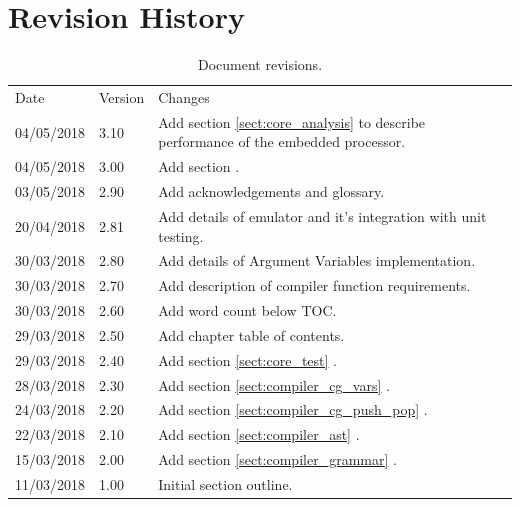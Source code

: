 \documentclass[11pt,a4paper]{report}
\begin{document}
\pagestyle{plain}

\section*{Revision History}
\begin{table}[h]
\def\arraystretch{1.5}
    \begin{tabularx}{\textwidth}{|l|l|X|}
    \hline
    Date & Version & Changes \\
    \arrayrulecolor{blue9}
	\specialrule{2pt}{-2pt}{0pt}
	04/05/2018 & 3.10 & Add section \ref{sect:core_analysis} {\nameref{sect:core_analysis}} to describe performance of the embedded processor. \\ \hline
	04/05/2018 & 3.00 & Add section {\nameref{sect:preface}}. \\ \hline
	03/05/2018 & 2.90 & Add acknowledgements and glossary. \\ \hline
	20/04/2018 & 2.81 & Add details of emulator and it's integration with unit testing.\\ \hline
	30/03/2018 & 2.80 & Add details of Argument Variables implementation. \\ \hline
	30/03/2018 & 2.70 & Add description of compiler function requirements. \\ \hline
	30/03/2018 & 2.60 & Add word count below TOC. \\ \hline
	29/03/2018 & 2.50 & Add chapter table of contents. \\ \hline
	29/03/2018 & 2.40 & Add section \ref{sect:core_test} \nameref{sect:core_test}. \\ \hline
	28/03/2018 & 2.30 & Add section \ref{sect:compiler_cg_vars} \nameref{sect:compiler_cg_vars}. \\ \hline
	24/03/2018 & 2.20 & Add section \ref{sect:compiler_cg_push_pop} \nameref{sect:compiler_cg_push_pop}. \\ \hline
	22/03/2018 & 2.10 & Add section \ref{sect:compiler_ast} \nameref{sect:compiler_ast}. \\ \hline
	15/03/2018 & 2.00 & Add section \ref{sect:compiler_grammar} \nameref{sect:compiler_grammar}. \\ \hline
	11/03/2018 & 1.00 & Initial section outline. \\ \hline
    \end{tabularx}
    \caption{Document revisions.}
\end{table}

\newpage
\end{document}
